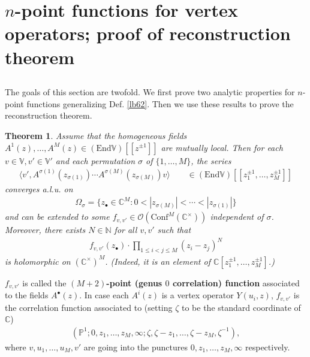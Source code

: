 \documentclass[11pt,b5paper,notitlepage]{article}
\theoremstyle{definition}
\theoremstyle{plain}
\newtheorem{thm}[df]{Theorem}
\newcommand{\End}{\mathrm{End}} %
\newcommand{\Conf}{\mathrm{Conf}}
\newcommand{\bigbk}[1]{\big\langle {#1}\big\rangle}
\newcommand{\scr}{\mathscr}
\newcommand{\blt}{\bullet}
\newcommand{\Vbb}{\mathbb V}
\newcommand{\Cbb}{\mathbb C}
\newcommand{\Nbb}{\mathbb N}
\newcommand{\Pbb}{\mathbb P}
\numberwithin{equation}{section}
\begin{document}
\section{$n$-point functions for vertex operators; proof of reconstruction theorem} \label{lb84}


\subsection{}\label{lb85}

The goals of this section are twofold. We first prove two analytic properties for $n$-point functions generalizing Def. \ref{lb62}. Then we use these results to prove the reconstruction theorem.


\begin{thm}\label{lb74}
Assume that the homogeneous fields $A^1(z),\dots,A^M(z)\in(\End\Vbb)[[z^{\pm1}]]$ are mutually local. Then for each $v\in\Vbb,v'\in\Vbb'$ and each permutation $\sigma$ of $\{1,\dots,M\}$, the series
\begin{align}
\bigbk{v',A^{\sigma(1)}(z_{\sigma(1)})\cdots A^{\sigma(M)}(z_{\sigma(M)})v}\qquad\in(\End\Vbb)[[z_1^{\pm1},\dots,z_M^{\pm1}]]\label{eq116}
\end{align}
converges a.l.u. on
\begin{align}
\Omega_\sigma=\{z_\blt\in\Cbb^M:0<|z_{\sigma(M)}|<\cdots<|z_{\sigma(1)}|\}	\label{eq115}
\end{align}
and can be extended to some $f_{v,v'}\in\scr O(\Conf^M(\Cbb^\times))$ independent of $\sigma$. Moreover, there exists $N\in\Nbb$ for all $v,v'$ such that
\begin{align}
f_{v,v'}(z_\blt)\cdot \prod_{1\leq i<j\leq M}(z_i-z_j)^N	
\end{align}
is holomorphic on $(\Cbb^\times)^M$. (Indeed, it is an element of $\Cbb[z_1^{\pm1},\dots,z_M^{\pm1}]$.)
\end{thm}

$f_{v,v'}$ is called the \textbf{$(M+2)$-point (genus $0$ correlation) function} associated to the fields $A^\blt(z)$. In case each $A^i(z)$ is a vertex operator $Y(u_i,z)$, $f_{v,v'}$ is the correlation function associated to (setting $\zeta$ to be the standard coordinate of $\Cbb$)
\begin{align}
(\Pbb^1;0,z_1,\dots,z_M,\infty;\zeta,\zeta-z_1,\dots,\zeta-z_M,\zeta^{-1}),	
\end{align}
where $v,u_1,\dots,u_M,v'$ are going into the punctures $0,z_1,\dots,z_M,\infty$ respectively.
\end{document}
